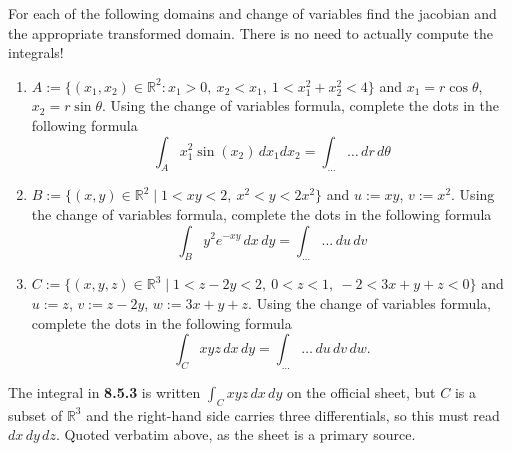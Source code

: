 

\begin{exercise}
\label{ex:change_of_variables_computations}
For each of the following domains and change of variables find the jacobian and the appropriate
transformed domain. There is no need to actually compute the integrals!
\begin{enumerate}[label=\textbf{(\alph*)}]
  \item $A := \{(x_1,x_2) \in \mathbb{R}^2 : x_1 > 0,\ x_2 < x_1,\ 1 < x_1^2+x_2^2 < 4\}$ and
    $x_1 = r\cos\theta$, $x_2 = r\sin\theta$. Using the change of variables formula, complete
    the dots in the following formula
    \[\int_A x_1^2\sin(x_2)\,dx_1dx_2 = \int_{\dots}\dots\,dr\,d\theta\]
  \item $B := \{(x,y) \in \mathbb{R}^2 \mid 1 < xy < 2,\ x^2 < y < 2x^2\}$ and $u := xy$,
    $v := x^2$. Using the change of variables formula, complete the dots in the following
    formula
    \[\int_B y^2e^{-xy}\,dx\,dy = \int_{\dots}\dots\,du\,dv\]
  \item $C := \{(x,y,z) \in \mathbb{R}^3 \mid 1 < z-2y < 2,\ 0 < z < 1,\ -2 < 3x+y+z < 0\}$ and
    $u := z$, $v := z-2y$, $w := 3x+y+z$. Using the change of variables formula, complete the
    dots in the following formula
    \[\int_C xyz\,dx\,dy = \int_{\dots}\dots\,du\,dv\,dw.\]
\end{enumerate}

\end{exercise}

\begin{ainote}
The integral in \textbf{8.5.3} is written $\int_C xyz\,dx\,dy$ on the official sheet, but $C$ is
a subset of $\mathbb{R}^3$ and the right-hand side carries three differentials, so this must
read $dx\,dy\,dz$. Quoted verbatim above, as the sheet is a primary source.
\end{ainote}


